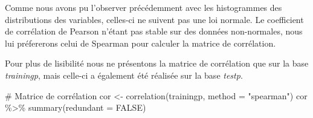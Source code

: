 \documentclass[
  french,
  11pt,
  a4paper,
]{article}
\newenvironment{Shaded}{}{}
\newcommand{\AttributeTok}[1]{\textcolor[rgb]{0.84,0.23,0.29}{#1}}
\newcommand{\CommentTok}[1]{\textcolor[rgb]{0.42,0.45,0.49}{#1}}
\newcommand{\ConstantTok}[1]{\textcolor[rgb]{0.00,0.36,0.77}{#1}}
\newcommand{\FunctionTok}[1]{\textcolor[rgb]{0.44,0.26,0.76}{#1}}
\newcommand{\NormalTok}[1]{\textcolor[rgb]{0.14,0.16,0.18}{#1}}
\newcommand{\OtherTok}[1]{\textcolor[rgb]{0.44,0.26,0.76}{#1}}
\newcommand{\SpecialCharTok}[1]{\textcolor[rgb]{0.00,0.36,0.77}{#1}}
\newcommand{\StringTok}[1]{\textcolor[rgb]{0.01,0.18,0.38}{#1}}
\begin{document}
Comme nous avons pu l'observer précédemment avec les histogrammes des
distributions des variables, celles-ci ne suivent pas une loi normale.
Le coefficient de corrélation de Pearson n'étant pas stable sur des
données non-normales, nous lui préfererons celui de Spearman pour
calculer la matrice de corrélation.

Pour plus de lisibilité nous ne présentons la matrice de corrélation que
sur la base \emph{trainingp}, mais celle-ci a également été réalisée sur
la base \emph{testp}.

\begin{Shaded}
\begin{Highlighting}[]
\CommentTok{\# Matrice de corrélation}
\NormalTok{cor }\OtherTok{\textless{}{-}} \FunctionTok{correlation}\NormalTok{(trainingp, }\AttributeTok{method =} \StringTok{"spearman"}\NormalTok{)}
\NormalTok{cor }\SpecialCharTok{\%\textgreater{}\%}
  \FunctionTok{summary}\NormalTok{(}\AttributeTok{redundant =} \ConstantTok{FALSE}\NormalTok{)}
\end{Highlighting}
\end{Shaded}
\end{document}
